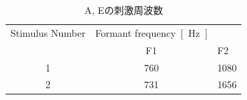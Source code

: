 \documentclass[../main]{subfiles}
\begin{document}
\newpage
{}
\begin{table}[H]
  \caption{A, Eの刺激周波数}\label{tab:ae}
  \centering
    \begin{tabular}{c|cl}
      Stimulus Number & Formant frequency\SI{}{[\hertz]} \\
          & F1 & F2 \\ \hline
      1 & 760 & 1080 \\
      2 & 731 & 1656\\
    \end{tabular}
\end{table}
\end{document}
